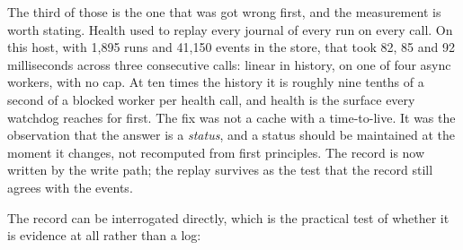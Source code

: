 The third of those is the one that was got wrong first, and the measurement is worth stating. Health
used to replay every journal of every run on every call. On this host, with 1{,}895 runs and
41{,}150 events in the store, that took 82, 85 and 92 milliseconds across three consecutive calls:
linear in history, on one of four async workers, with no cap. At ten times the history it is roughly
nine tenths of a second of a blocked worker per health call, and health is the surface every
watchdog reaches for first. The fix was not a cache with a time-to-live. It was the observation that
the answer is a \emph{status}, and a status should be maintained at the moment it changes, not
recomputed from first principles. The record is now written by the write path; the replay survives
as the test that the record still agrees with the events.

\begin{center}

\end{center}

The record can be interrogated directly, which is the practical test of whether it is evidence at
all rather than a log:

